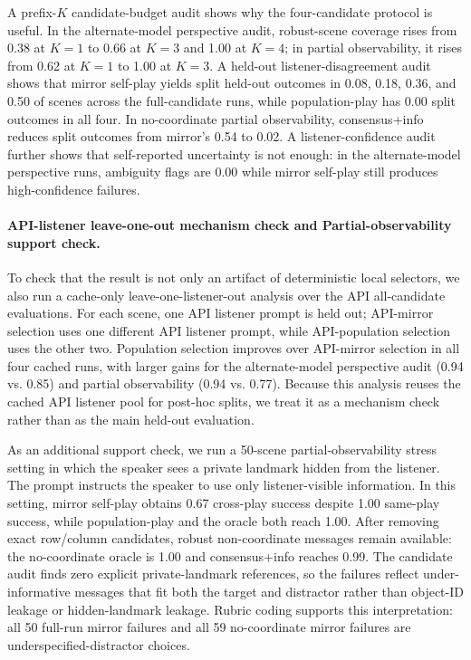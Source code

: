 \documentclass[10pt]{article}
\begin{document}
A prefix-$K$ candidate-budget audit shows why the four-candidate protocol is useful. In the alternate-model perspective audit, robust-scene coverage rises from 0.38 at $K=1$ to 0.66 at $K=3$ and 1.00 at $K=4$; in partial observability, it rises from 0.62 at $K=1$ to 1.00 at $K=3$. A held-out listener-disagreement audit shows that mirror self-play yields split held-out outcomes in 0.08, 0.18, 0.36, and 0.50 of scenes across the full-candidate runs, while population-play has 0.00 split outcomes in all four. In no-coordinate partial observability, consensus+info reduces split outcomes from mirror's 0.54 to 0.02. A listener-confidence audit further shows that self-reported uncertainty is not enough: in the alternate-model perspective runs, ambiguity flags are 0.00 while mirror self-play still produces high-confidence failures.

\paragraph{API-listener leave-one-out mechanism check and Partial-observability support check.}
To check that the result is not only an artifact of deterministic local selectors, we also run a cache-only leave-one-listener-out analysis over the API all-candidate evaluations. For each scene, one API listener prompt is held out; API-mirror selection uses one different API listener prompt, while API-population selection uses the other two. Population selection improves over API-mirror selection in all four cached runs, with larger gains for the alternate-model perspective audit (0.94 vs. 0.85) and partial observability (0.94 vs. 0.77). Because this analysis reuses the cached API listener pool for post-hoc splits, we treat it as a mechanism check rather than as the main held-out evaluation.

As an additional support check, we run a 50-scene partial-observability stress setting in which the speaker sees a private landmark hidden from the listener. The prompt instructs the speaker to use only listener-visible information. In this setting, mirror self-play obtains 0.67 cross-play success despite 1.00 same-play success, while population-play and the oracle both reach 1.00. After removing exact row/column candidates, robust non-coordinate messages remain available: the no-coordinate oracle is 1.00 and consensus+info reaches 0.99. The candidate audit finds zero explicit private-landmark references, so the failures reflect under-informative messages that fit both the target and distractor rather than object-ID leakage or hidden-landmark leakage. Rubric coding supports this interpretation: all 50 full-run mirror failures and all 59 no-coordinate mirror failures are underspecified-distractor choices.
\end{document}
